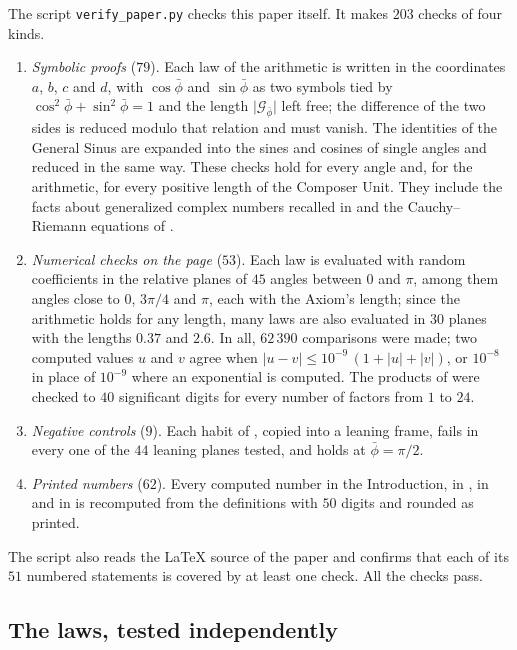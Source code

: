 \documentclass[11pt,a4paper]{amsart}
\theoremstyle{plain}
\theoremstyle{definition}
\theoremstyle{remark}
\newcommand{\pb}{\bar{\phi}}                     %
\newcommand{\Gp}{\mathcal{G}_{\bar{\phi}}}       %
\begin{document}
The script \texttt{verify\_paper.py} checks this paper itself. It makes $203$ checks of four kinds.
\begin{enumerate}
  \item \emph{Symbolic proofs} ($79$). Each law of the arithmetic is written in the coordinates $a$, $b$, $c$ and $d$, with $\cos\pb$ and $\sin\pb$ as two symbols tied by $\cos^2\pb + \sin^2\pb = 1$ and the length $\lvert\Gp\rvert$ left free; the difference of the two sides is reduced modulo that relation and must vanish. The identities of the General Sinus are expanded into the sines and cosines of single angles and reduced in the same way. These checks hold for every angle and, for the arithmetic, for every positive length of the Composer Unit. They include the facts about generalized complex numbers recalled in  and the Cauchy--Riemann equations of .
  \item \emph{Numerical checks on the page} ($53$). Each law is evaluated with random coefficients in the relative planes of $45$ angles between $0$ and $\pi$, among them angles close to $0$, $3\pi/4$ and $\pi$, each with the Axiom's length; since the arithmetic holds for any length, many laws are also evaluated in $30$ planes with the lengths $0.37$ and $2.6$. In all, $62\,390$ comparisons were made; two computed values $u$ and $v$ agree when $\lvert u - v\rvert \le 10^{-9}\,(1 + \lvert u\rvert + \lvert v\rvert)$, or $10^{-8}$ in place of $10^{-9}$ where an exponential is computed. The products of  were checked to $40$ significant digits for every number of factors from $1$ to $24$.
  \item \emph{Negative controls} ($9$). Each habit of , copied into a leaning frame, fails in every one of the $44$ leaning planes tested, and holds at $\pb = \pi/2$.
  \item \emph{Printed numbers} ($62$). Every computed number in the Introduction, in , in  and in  is recomputed from the definitions with $50$ digits and rounded as printed.
\end{enumerate}
The script also reads the \LaTeX{} source of the paper and confirms that each of its $51$ numbered statements is covered by at least one check. All the checks pass.

\subsection{The laws, tested independently}
\end{document}

